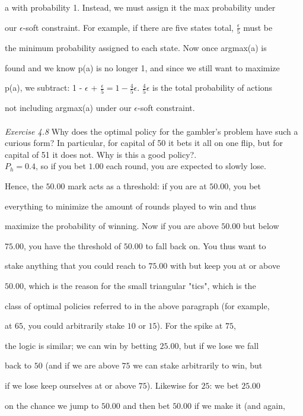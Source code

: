 \documentclass{article}
\begin{document}
a with probability 1. Instead, we must assign it the max probability under 

our $\epsilon$-soft constraint. For example, if there are five states total, $\frac{\epsilon}{5}$ must be 

the minimum probability assigned to each state. Now once argmax(a) is 

found and we know p(a) is no longer 1, and since we still want to maximize 

p(a), we subtract: 1 - $\epsilon$ + $\frac{\epsilon}{5} = 1 - \frac{4}{5}\epsilon$. $\frac{4}{5}\epsilon$ is the total probability of actions 

not including argmax(a) under our $\epsilon$-soft constraint.
\\\\
\textit{Exercise 4.8} Why does the optimal policy for the gambler’s problem have such a curious
form? In particular, for capital of 50 it bets it all on one flip, but for capital of 51 it does
not. Why is this a good policy?. 
\\

$P_{h} = 0.4$, so if you bet $1.00$ each round, you are expected to slowly lose. 

Hence, the $50.00$ mark acts as a threshold: if you are at $50.00$, you bet 

everything to minimize the amount of rounds played to win and thus 

maximize the probability of winning. Now if you are above $50.00$ but below 

$75.00$, you have the threshold of $50.00$ to fall back on. You thus want to

stake anything that you could reach to $75.00$ with but keep you at or above 

$50.00$, which is the reason for the small triangular "tics", which is the 

class of optimal policies referred to in the above paragraph (for example, 

at $65$, you could arbitrarily stake $10$ or $15$). For the spike at $75$, 

the logic is similar; we can win by betting $25.00$, but if we lose we fall 

back to $50$ (and if we are above $75$ we can stake arbitrarily to win, but 

if we lose keep ourselves at or above $75$). Likewise for $25$: we bet $25.00$ 

on the chance we jump to $50.00$ and then bet $50.00$ if we make it (and again, 
\end{document}
